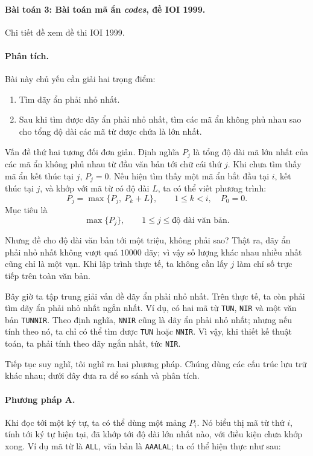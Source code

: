 \documentclass[11pt]{article}
\begin{document}
\paragraph{Bài toán 3: Bài toán mã ẩn \textit{codes}, đề IOI 1999.}

Chi tiết đề xem đề thi IOI 1999.

\paragraph{Phân tích.}
Bài này chủ yếu cần giải hai trọng điểm:
\begin{enumerate}
  \item Tìm dãy ẩn phải nhỏ nhất.
  \item Sau khi tìm được dãy ẩn phải nhỏ nhất, tìm các mã ẩn không phủ nhau
  sao cho tổng độ dài các mã từ được chứa là lớn nhất.
\end{enumerate}

Vấn đề thứ hai tương đối đơn giản. Định nghĩa \(P_j\) là tổng độ dài mã lớn
nhất của các mã ẩn không phủ nhau từ đầu văn bản tới chữ cái thứ \(j\). Khi
chưa tìm thấy mã ẩn kết thúc tại \(j\), \(P_j=0\). Nếu hiện tìm thấy một mã
ẩn bắt đầu tại \(i\), kết thúc tại \(j\), và khớp với mã từ có độ dài \(L\),
ta có thể viết phương trình:
\[
P_j=\max\{P_j,\ P_k+L\},\qquad 1\le k<i,\quad P_0=0.
\]
Mục tiêu là
\[
\max\{P_j\},\qquad 1\le j\le \text{độ dài văn bản}.
\]

Nhưng đề cho độ dài văn bản tới một triệu, không phải sao? Thật ra, dãy ẩn
phải nhỏ nhất không vượt quá \(10000\) dãy; vì vậy số lượng khác nhau nhiều
nhất cũng chỉ là một vạn. Khi lập trình thực tế, ta không cần lấy \(j\) làm
chỉ số trực tiếp trên toàn văn bản.

Bây giờ ta tập trung giải vấn đề dãy ẩn phải nhỏ nhất. Trên thực tế, ta còn
phải tìm dãy ẩn phải nhỏ nhất ngắn nhất. Ví dụ, có hai mã từ \texttt{TUN},
\texttt{NIR} và một văn bản \texttt{TUNNIR}. Theo định nghĩa, \texttt{NNIR}
cũng là dãy ẩn phải nhỏ nhất; nhưng nếu tính theo nó, ta chỉ có thể tìm được
\texttt{TUN} hoặc \texttt{NNIR}. Vì vậy, khi thiết kế thuật toán, ta phải
tính theo dãy ngắn nhất, tức \texttt{NIR}.

Tiếp tục suy nghĩ, tôi nghĩ ra hai phương pháp. Chúng dùng các cấu trúc lưu
trữ khác nhau; dưới đây đưa ra để so sánh và phân tích.

\paragraph{Phương pháp A.}
Khi đọc tới một ký tự, ta có thể dùng một mảng \(P_i\). Nó biểu thị mã từ
thứ \(i\), tính tới ký tự hiện tại, đã khớp tới độ dài lớn nhất nào, với điều
kiện chưa khớp xong. Ví dụ mã từ là \texttt{ALL}, văn bản là \texttt{AAALAL};
ta có thể hiện thực như sau:
\end{document}
